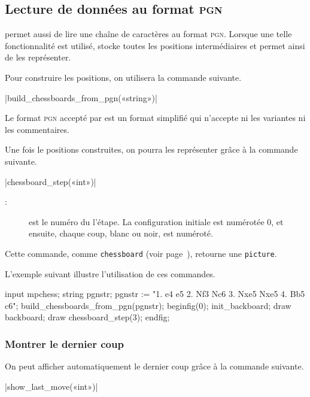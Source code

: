 \documentclass[french]{ltxdoc}
\begin{document}
\subsection{Lecture de données au format \textsc{pgn}}

\mpchess permet aussi de lire une chaîne de caractères au format \textsc{pgn}.
Lorsque une telle fonctionnalité est utilisé, \mpchess stocke toutes les
positions intermédiaires et permet ainsi de les représenter.

Pour construire les positions, on utilisera la commande suivante.

\commande|build_chessboards_from_pgn(«string»)|\smallskip

Le format \textsc{pgn} accepté par \mpchess est un format simplifié qui
n’accepte ni les variantes ni les commentaires.

Une fois le positions construites, on pourra les représenter grâce à la commande suivante.

\commande|chessboard_step(«int»)|\smallskip
\begin{description}
\item[:] est le numéro du l’étape. La configuration initiale est numérotée 0, et ensuite, chaque coup, blanc ou noir, est numéroté.
\end{description}

Cette commande, comme \lstinline+chessboard+ (voir page~\pageref{com:chessboard}), retourne une \lstinline+picture+.

L’exemple suivant illustre l’utilisation de ces commandes.

\begin{ExempleMP}
input mpchess;
string pgnstr;
pgnstr := "1. e4 e5 2. Nf3 Nc6 3. Nxe5 Nxe5 4. Bb5 c6";
build_chessboards_from_pgn(pgnstr);
beginfig(0);
init_backboard;
draw backboard;
draw chessboard_step(3); %
endfig;
\end{ExempleMP}

\subsubsection{Montrer le dernier coup}

On peut afficher automatiquement le dernier coup grâce à la commande suivante.

\commande|show_last_move(«int»)|\smallskip
\end{document}
